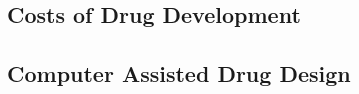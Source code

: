 \subsection{Costs of Drug Development}
\label{subsection:costs_of_drug_development}


\subsection{Computer Assisted Drug Design}
\label{subsection:computer_assisted_drug_design}

